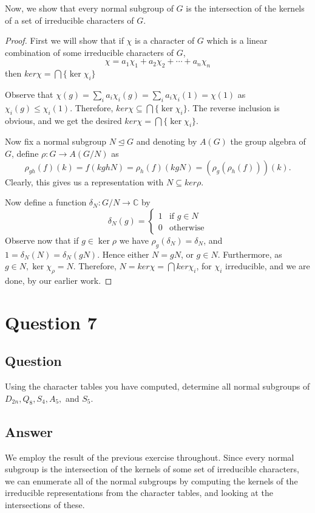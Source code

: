 \documentclass[11pt]{article}
\begin{document}
Now, we show that every normal subgroup of $G$ is the intersection of the kernels of a set of irreducible characters of $G$. 
\begin{proof}
First we will show that if $\chi$ is a character of $G$ which is a linear combination of some irreducible characters of $G$, 
 \[\chi = a_1 \chi_1 + a_2 \chi_2 + \cdots + a_n \chi_n\]
then $ker\chi= \bigcap\{ \ker\chi_i \}$

Observe that $\chi(g)  = \sum_i a_i \chi_i(g)  = \sum_i a_i \chi_i(1) = \chi(1)$ as $ \chi_i(g) \leq \chi_i(1) $. Therefore, $ker\chi \subseteq \bigcap \{ \ker\chi_i \}$. The reverse inclusion is obvious, and we get the desired  $ker\chi= \bigcap\{ \ker\chi_i \}$.

Now fix a normal subgroup $N \unlhd G$ and denoting by $A(G)$ the group algebra of $G$, define $\rho: G \to A(G/N)$ as
\[\rho_{gh}(f) (k) = f(kghN) = \rho_h (f) (kgN) =(\rho_g(\rho_h(f)))(k).\]
Clearly, this gives us a representation with $N \subseteq ker\rho$. 

Now define a function $\delta_N: G/N \to\mathbb{C}$ by
\[\delta_N(g) = \left\{ \begin{array}{ll} 1 & \mbox{if }g \in N \\ 0 & \mbox{otherwise} \end{array} \right. \]
Observe now that if $g \in \ker\rho$ we have $\rho_g(\delta_N) = \delta_N$, and $1 = \delta_N(N) = \delta_N(gN)$. Hence either $N = gN$, or $g \in N$. Furthermore,  as $g\in N, \ker \chi_\rho = N$. Therefore, $N = ker\chi = \bigcap ker \chi_i$, for $\chi_i$ irreducible, and we are done, by our earlier work.
\end{proof}

\section{Question 7}
\subsection{Question}
Using the character tables you have computed, determine all normal subgroups of $D_{2n}, Q_8, S_4, A_5,$ and $S_5$.
\subsection{Answer}
We employ the result of the previous exercise throughout. Since every normal subgroup is the intersection of the kernels of some set of irreducible characters, we can enumerate all of the normal subgroups by computing the kernels of the irreducible representations from the character tables, and looking at the intersections of these. 
\end{document}

